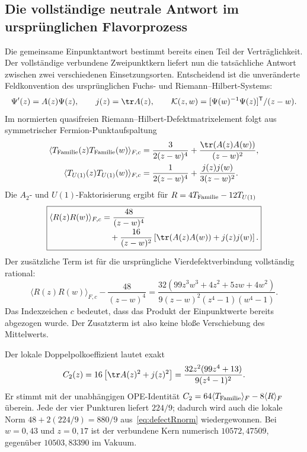 \subsection{Die vollständige neutrale Antwort im ursprünglichen Flavorprozess}\label{sec:fullflavorRR}
Die gemeinsame Einpunktantwort bestimmt bereits einen Teil der Verträglichkeit.
Der vollständige verbundene Zweipunktkern liefert nun die tatsächliche Antwort
zwischen zwei verschiedenen Einsetzungsorten. Entscheidend ist die unveränderte
Feldkonvention des ursprünglichen Fuchs- und Riemann--Hilbert-Systems:
\[
 \Psi'(z)=A(z)\Psi(z),\qquad j(z)=\tr A(z),\qquad
 \mathcal K(z,w)=[\Psi(w)^{-1}\Psi(z)]^{\mathsf T}/(z-w).
\]
Im normierten quasifreien Riemann--Hilbert-Defektmatrixelement folgt aus
symmetrischer Fermion-Punktaufspaltung~\cite[Abschnitte 3.3 und 4.1]{gavrylenkomarshakov}
\begin{align}
 \langle T_{\rm Familie}(z)T_{\rm Familie}(w)\rangle_{F,c}
 &=\frac{3}{2(z-w)^4}
   +\frac{\tr\!\left(A(z)A(w)\right)}{(z-w)^2},\\
 \langle T_{U(1)}(z)T_{U(1)}(w)\rangle_{F,c}
 &=\frac{1}{2(z-w)^4}+\frac{j(z)j(w)}{3(z-w)^2}.
\end{align}
Die $A_2$- und $U(1)$-Faktorisierung ergibt für $R=4T_{\rm Familie}-12T_{U(1)}$
\begin{equation}\label{eq:fullflavorRR}
\boxed{\begin{aligned}
 \langle R(z)R(w)\rangle_{F,c}
 &=\frac{48}{(z-w)^4}\\[-2pt]
 &\quad+\frac{16}{(z-w)^2}
 \left[\tr\!\left(A(z)A(w)\right)+j(z)j(w)\right].
\end{aligned}}
\end{equation}
Der zusätzliche Term ist für die ursprüngliche Vierdefektverbindung vollständig rational:
\begin{equation}
 \langle R(z)R(w)\rangle_{F,c}-\frac{48}{(z-w)^4}
 =\frac{32(99z^3w^3+4z^2+5zw+4w^2)}
 {9(z-w)^2(z^4-1)(w^4-1)}.
\end{equation}
Das Indexzeichen $c$ bedeutet, dass das Produkt der Einpunktwerte bereits
abgezogen wurde. Der Zusatzterm ist also keine bloße Verschiebung des Mittelwerts.

Der lokale Doppelpolkoeffizient lautet exakt
\begin{equation}
 C_2(z)=16\left[\tr A(z)^2+j(z)^2\right]
 =\frac{32z^2(99z^4+13)}{9(z^4-1)^2}.
\end{equation}
Er stimmt mit der unabhängigen OPE-Identität
$C_2=64\langle T_{\rm Familie}\rangle_F-8\langle R\rangle_F$ überein.
Jede der vier Punkturen liefert $224/9$; dadurch wird auch die lokale Norm
$48+2(224/9)=880/9$ aus~\eqref{eq:defectRnorm} wiedergewonnen.
Bei $w=0{,}43$ und $z=0{,}17$ ist der verbundene Kern numerisch
$10572{,}47509$, gegenüber $10503{,}83390$ im Vakuum.

